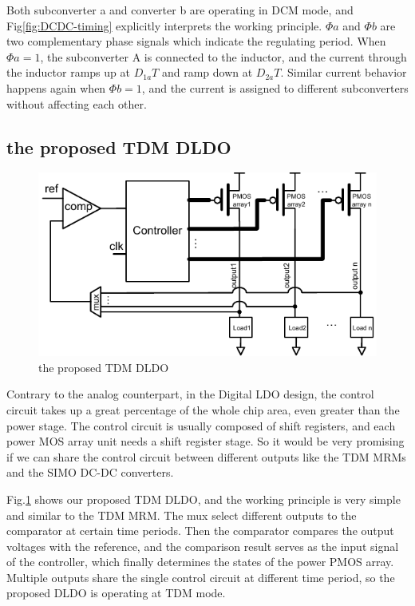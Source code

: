 \documentclass[journal]{IEEEtran}
\begin{document}
Both subconverter a and converter b are operating in DCM mode, and Fig\ref{fig:DCDC-timing} explicitly interprets the working principle. $\Phi a$ and $\Phi b$ are two complementary phase signals which indicate the regulating period. When $\Phi a = 1$, the subconverter A is connected to the inductor, and the current through the inductor ramps up at $D_{1a}T$ and ramp down at $D_{2a}T$. Similar current behavior happens again when $\Phi b =1$, and the current is assigned to different subconverters without affecting each other. 

\subsection{the proposed TDM DLDO}
\begin{figure}[t!]
    \centering
    \includegraphics[width=\linewidth]{pic/TDM/TDMDLDO.pdf}
    \caption{the proposed TDM DLDO}
    \label{fig:TDMDLDO}
\end{figure}
Contrary to the analog counterpart, in the Digital LDO design, the control circuit takes up a great percentage of the whole chip area, even greater than the power stage. The control circuit is usually composed of shift registers, and each power MOS array unit needs a shift register stage. So it would be very promising if we can share the control circuit between different outputs like the TDM MRMs and the SIMO DC-DC converters.

Fig.\ref{fig:TDMDLDO} shows our proposed TDM DLDO, and the working principle is very simple and similar to the TDM MRM. The mux select different outputs to the comparator at certain time periods. Then the comparator compares the output voltages with the reference, and the comparison result serves as the input signal of the controller, which finally determines the states of the power PMOS array. Multiple outputs share the single control circuit at different time period, so the proposed DLDO is operating at TDM mode.
\end{document}
